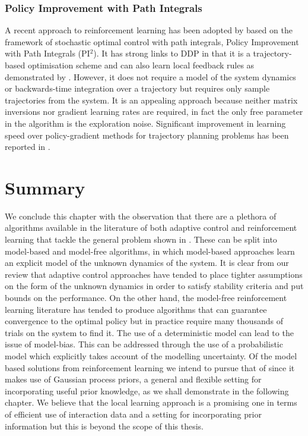 \subsubsection{Policy Improvement with Path Integrals}
A recent approach to reinforcement learning has been adopted by \cite{TBS10b} based on the framework of stochastic optimal control with path integrals, Policy Improvement with Path Integrals (PI$^2$). It has strong links to DDP in that it is a trajectory-based optimisation scheme and can also learn local feedback rules as demonstrated by \cite{BSTS11}. However, it does not require a model of the system dynamics or backwards-time integration over a trajectory but requires only sample trajectories from the system. It is an appealing approach because neither matrix inversions nor gradient learning rates are required, in fact the only free parameter in the algorithm is the exploration noise. Significant improvement in learning speed over policy-gradient methods for trajectory planning problems has been reported in \cite{TBS10a}.



\section{Summary}

We conclude this chapter with the observation that there are a plethora of algorithms available in the literature of both adaptive control and reinforcement learning that tackle the general problem shown in . These can be split into model-based and model-free algorithms, in which model-based approaches learn an explicit model of the unknown dynamics of the system. 
%
It is clear from our review that adaptive control approaches have tended to place tighter assumptions on the form of the unknown dynamics in order to satisfy stability criteria and put bounds on the performance. On the other hand, the model-free reinforcement learning literature has tended to produce algorithms that can guarantee convergence to the optimal policy but in practice require many thousands of trials on the system to find it. The use of a deterministic model can lead to the issue of model-bias. This can be addressed through the use of a probabilistic model which explicitly takes account of the modelling uncertainty. Of the model based solutions from reinforcement learning we intend to pursue that of \cite{DR11} since it makes use of Gaussian process priors, a general and flexible setting for incorporating useful prior knowledge, as we shall demonstrate in the following chapter. We believe that the local learning approach is a promising one in terms of efficient use of interaction data and a setting for incorporating prior information but this is beyond the scope of this thesis.
